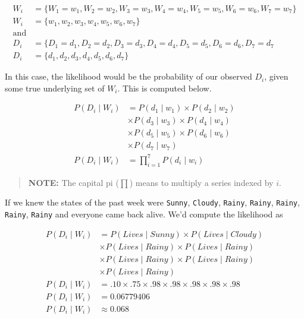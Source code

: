 \documentclass[
]{book}
\begin{document}
\begin{align*}
W_i &= \{W_1= w_1, W_2=w_2, W_3=w_3,W_4= w_4, W_5=w_5, W_6=w_6, W_7=w_7\}\\
W_i &= \{w_1, w_2, w_3, w_4, w_5, w_6, w_7\} \\[15pt]
\text{and}\\[15pt]
D_i &= \{D_1= d_1, D_2=d_2, D_3=d_3,D_4= d_4, D_5=d_5, D_6=d_6, D_7=d_7\\
D_i &= \{d_1, d_2, d_3, d_4, d_5, d_6, d_7\}
\end{align*}

In this case, the likelihood would be the probability of our observed \(D_i\), given some true underlying set of \(W_i\). This is computed below.

\begin{align*}
P(D_i \mid W_i) &= P(d_1 \mid w_1)  \times  P(d_2 \mid w_2) \\ 
& \times  P(d_3 \mid w_3)  \times  P(d_4 \mid w_4) \\ &  \times  P(d_5 \mid w_5)  \times  P(d_6 \mid w_6) \\
& \times P(d_7 \mid w_7) \\
P(D_i \mid W_i) &= \prod_{i=1}^7 P(d_i \mid w_i)
\end{align*}

\begin{quote}
\textbf{NOTE:} The capital pi (\(\prod\)) means to multiply a series indexed by \(i\).
\end{quote}

\hfill\break

If we knew the states of the past week were \texttt{Sunny}, \texttt{Cloudy}, \texttt{Rainy}, \texttt{Rainy}, \texttt{Rainy}, \texttt{Rainy}, \texttt{Rainy} and everyone came back alive. We'd compute the likelihood as

\begin{align*}
P(D_i \mid W_i) &= P(Lives \mid Sunny) \times P(Lives \mid Cloudy)\\
&\times P(Lives \mid Rainy)\times P(Lives \mid Rainy) \\
&   \times P(Lives \mid Rainy) \times P(Lives \mid Rainy) \\
& \times P(Lives \mid Rainy) \\[10pt]
P(D_i \mid W_i) &= .10 \times .75 \times .98  \times .98  \times .98  \times .98  \times .98  \\
P(D_i \mid W_i) &= 0.06779406  \\
P(D_i \mid W_i) &\approx 0.068  \\
\end{align*}
\end{document}
